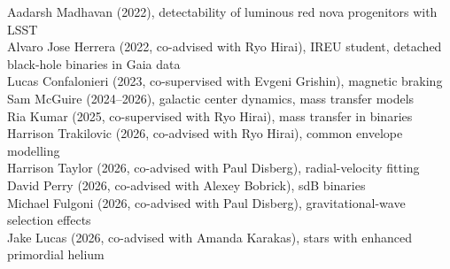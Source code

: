 \documentclass[margin,line]{res}
\begin{document}
\begin{resume}
Aadarsh Madhavan (2022), detectability of luminous red nova progenitors with LSST\\
Alvaro Jose Herrera (2022, co-advised with Ryo Hirai), IREU student, detached black-hole binaries in Gaia data\\
Lucas Confalonieri (2023, co-supervised with Evgeni Grishin), magnetic braking\\
Sam McGuire (2024--2026), galactic center dynamics, mass transfer models\\
Ria Kumar (2025, co-supervised with Ryo Hirai), mass transfer in binaries\\
Harrison Trakilovic (2026, co-advised with Ryo Hirai), common envelope modelling\\
Harrison Taylor (2026, co-advised with Paul Disberg), radial-velocity fitting\\
David Perry (2026, co-advised with Alexey Bobrick), sdB binaries \\
Michael Fulgoni (2026, co-advised with Paul Disberg), gravitational-wave selection effects\\
Jake Lucas (2026, co-advised with Amanda Karakas), stars with enhanced primordial helium\\
 




\end{resume}
\end{document}

